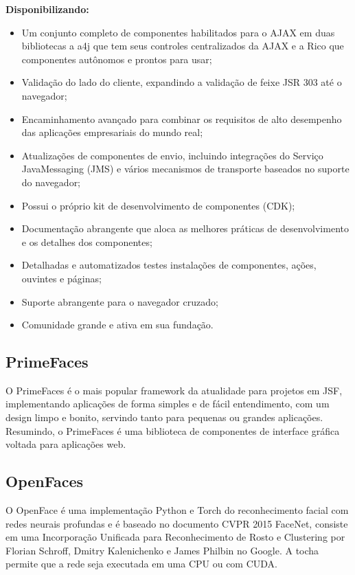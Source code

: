 \documentclass[12pt,a4paper]{article}
\begin{document}
\textbf{Disponibilizando:}
\begin{itemize}
\item Um conjunto completo de componentes habilitados para o AJAX em duas bibliotecas a a4j que tem seus controles centralizados da AJAX e a Rico que componentes autônomos e prontos para usar;

\item Validação do lado do cliente, expandindo a validação de feixe JSR 303 até o navegador;
\item Encaminhamento avançado para combinar os requisitos de alto desempenho das aplicações empresariais do mundo real;

\item Atualizações de componentes de envio, incluindo integrações do Serviço JavaMessaging (JMS) e vários mecanismos de transporte baseados no suporte do navegador;

\item Possui o próprio kit de desenvolvimento de componentes (CDK);

\item Documentação abrangente que aloca as melhores práticas de desenvolvimento e os detalhes dos componentes;

\item Detalhadas e automatizados testes instalações de componentes, ações, ouvintes e páginas;

\item Suporte abrangente para o navegador cruzado;

\item Comunidade grande e ativa em sua fundação.
\end{itemize}

\subsection{PrimeFaces}
O PrimeFaces é o mais popular framework da atualidade para projetos em JSF, implementando aplicações de forma simples e de fácil entendimento, com um design limpo e bonito, servindo tanto para pequenas ou grandes aplicações. Resumindo, o PrimeFaces é uma biblioteca de componentes de interface gráfica voltada para aplicações web.

\subsection{OpenFaces}
O OpenFace é uma implementação Python e Torch do reconhecimento facial com redes neurais profundas e é baseado no documento CVPR 2015 FaceNet, consiste em uma Incorporação Unificada para Reconhecimento de Rosto e Clustering por Florian Schroff, Dmitry Kalenichenko e James Philbin no Google. A tocha permite que a rede seja executada em uma CPU ou com CUDA. 
\end{document}
